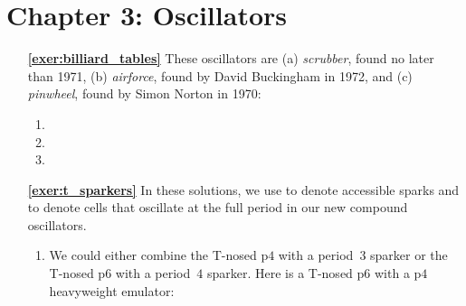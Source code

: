 \hypertarget{solutions_oscillators}{}\label{solutions_oscillators}
\section*{Chapter 3: Oscillators}
\renewcommand{\chapterfolder}{oscillators/}

\begin{multicols}{2}
\begin{itemize}[leftmargin=0em]
	\item[\bf\color{ocre}\sffamily\ref{exer:billiard_tables}] These oscillators are (a) \emph{scrubber}, found no later than 1971, (b) \emph{airforce}, found by David Buckingham in 1972, and (c) \emph{pinwheel}, found by Simon Norton in 1970: \\[-0.6em]
		\begin{enumerate}[leftmargin=1.5em,label=\bf\color{ocre}(\alph*)]
			\item {}
			
			\item {}
			
			\item {}
		\end{enumerate}
	
	
	\item[\bf\color{ocre}\sffamily\ref{exer:t_sparkers}] In these solutions, we use  to denote accessible sparks and  to denote cells that oscillate at the full period in our new compound oscillators.
	\begin{enumerate}[leftmargin=1.5em,label=\bf\color{ocre}(\alph*)]
		\item We could either combine the T-nosed p$4$ with a period~$3$ sparker or the T-nosed p$6$ with a period~$4$ sparker. Here is a T-nosed p$6$ with a p$4$ heavyweight emulator: \\[-0.6em]
		
		 \\[-0.8em]
		

\end{enumerate}
\end{itemize}
\end{multicols}
